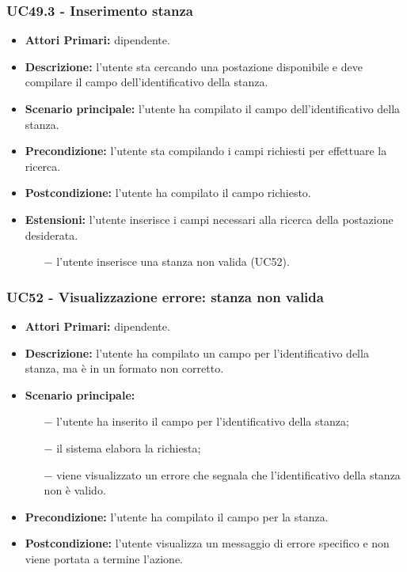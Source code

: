 \subsubsection{ UC49.3 - Inserimento stanza }
\begin{itemize}
	\item\textbf{Attori Primari:} dipendente.
	\item\textbf{Descrizione:} l’utente sta cercando una postazione disponibile e deve compilare il campo dell'identificativo della stanza.
	\item\textbf{Scenario principale:} l’utente ha compilato il campo dell'identificativo della stanza.
	\item\textbf{Precondizione:} l’utente sta compilando i campi richiesti per effettuare la ricerca.
	\item\textbf{Postcondizione:} l’utente ha compilato il campo richiesto.
	\item\textbf{Estensioni:} l’utente inserisce i campi necessari alla ricerca della postazione desiderata.
	\begin{itemize}
		\item[$-$] l’utente inserisce una stanza non valida (UC52).
	\end{itemize}
\end{itemize}
\subsubsection{ UC52 - Visualizzazione errore: stanza non valida }
\begin{itemize}
	\item\textbf{Attori Primari:} dipendente.
	\item\textbf{Descrizione:} l’utente ha compilato un campo per l'identificativo della stanza, ma è in un formato non corretto.
	\item\textbf{Scenario principale:} 
	\begin{itemize}
		\item[$-$] l’utente ha inserito il campo per l'identificativo della stanza;
		\item[$-$] il sistema elabora la richiesta;
		\item[$-$] viene visualizzato un errore che segnala che l'identificativo della stanza non è valido.
	\end{itemize}
	\item\textbf{Precondizione:} l’utente ha compilato il campo per la stanza.
	\item\textbf{Postcondizione:} l’utente visualizza un messaggio di errore specifico e non viene portata a termine l'azione.
\end{itemize}


